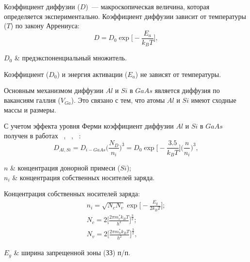 
Коэффициент диффузии ($D$)~--- макроскопическая величина, которая определяется экспериментально. Коэффициент диффузии зависит от температуры ($T$) по закону Аррениуса:
\begin{equation}
	\label{eq:DConst}
	D = D_{0}\exp\bigg[-\frac{E_{a}}{k_{B}T}\bigg],
\end{equation}
\begin{conditions}
	$D_{0}$ & предэкспоненциальный множитель.
\end{conditions}
Коэффициент ($D_{0}$) и энергия активации ($E_{a}$) не зависят от температуры.

Основным механизмом диффузии $Al$ и $Si$ в $GaAs$ является диффузия по вакансиям галлия ($V_{Ga}$). Это связано с тем, что атомы $Al$ и $Si$ имеют сходные массы и размеры. 

С учетом эффекта уровня Ферми коэффициент диффузии $Al$ и $Si$ в $GaAs$ получен в работах ~\cite{getMeshkov}, ~\cite{Makeev}, ~\cite{Gosele}:
\begin{equation}
	\label{eq:DNd}
	D_{Al,Si} = D_{i-GaAs}\Big( \frac{N_{D}}{n_{i}} \Big)^{3} = D_{0}\exp\bigg[-\frac{3.5}{k_{B}T}\bigg]\Big( \frac{n}{n_{i}} \Big)^{3},
\end{equation}
\begin{conditions}
	$n$ & концентрация донорной примеси ($Si$);\\
	$n_{i}$ & концентрация собственных носителей заряда.
\end{conditions}

Концентрация собственных носителей заряда:
\begin{gather}
	n_{i} = \sqrt{N_{c}N_{v}}\exp\!\bigg[ - \frac{E_{g}}{2k_{B}T} \bigg];\\
	N_{c} = 2\Big[ \frac{2\pi m_{e}^{\ast}k_{B}T}{h^{2}} \Big]^{\frac{3}{2}};\\
	N_{v} = 2\Big[ \frac{2\pi m_{h}^{\ast}k_{B}T}{h^{2}} \Big]^{\frac{3}{2}},
\end{gather}
\begin{conditions}
	$E_{g}$ & ширина запрещенной зоны (ЗЗ) п/п.
\end{conditions}
